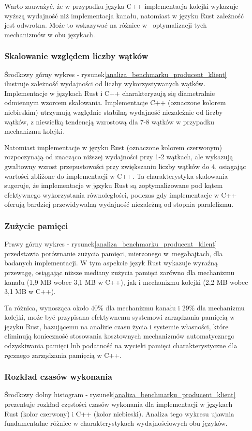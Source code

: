 Warto zauważyć, że w przypadku języka C++ implementacja kolejki wykazuje wyższą wydajność niż implementacja kanału, natomiast w języku Rust zależność jest odwrotna. Może to wskazywać na różnice w~ optymalizacji tych mechanizmów w obu językach.

\subsubsection{Skalowanie względem liczby wątków}
Środkowy górny wykres - rysunek\ref{analiza_benchmarku_producent_klient} ilustruje zależność wydajności od liczby wykorzystywanych wątków. Implementacje w językach Rust i C++ charakteryzują się diametralnie odmiennym wzorcem skalowania. Implementacje C++ (oznaczone kolorem niebieskim) utrzymują względnie stabilną wydajność niezależnie od liczby wątków, z niewielką tendencją wzrostową dla 7-8 wątków w przypadku mechanizmu kolejki.

Natomiast implementacje w języku Rust (oznaczone kolorem czerwonym) rozpoczynają od znacząco niższej wydajności przy 1-2 wątkach, ale wykazują gwałtowny wzrost przepustowości przy zwiększaniu liczby wątków do 4, osiągając wartości zbliżone do implementacji w C++. Ta charakterystyka skalowania sugeruje, że implementacje w języku Rust są zoptymalizowane pod kątem efektywnego wykorzystania równoległości, podczas gdy implementacje w C++ oferują bardziej przewidywalną wydajność niezależną od stopnia paralelizmu.

\subsubsection{Zużycie pamięci}
Prawy górny wykres - rysunek\ref{analiza_benchmarku_producent_klient} przedstawia porównanie zużycia pamięci, mierzonego w~megabajtach, dla badanych implementacji. W tym aspekcie język Rust wykazuje wyraźną przewagę, osiągając niższe mediany zużycia pamięci zarówno dla mechanizmu kanału (1,9 MB wobec 3,1 MB w C++), jak i mechanizmu kolejki (2,2 MB wobec 3,1 MB w C++).

Ta różnica, wynosząca około 40\% dla mechanizmu kanału i 29\% dla mechanizmu kolejki, może być przypisana efektywnemu systemowi zarządzania pamięcią w języku Rust, bazującemu na analizie czasu życia i systemie własności, które eliminują konieczność stosowania kosztownych mechanizmów automatycznego odzyskiwania pamięci lub podatność na wycieki pamięci charakterystyczne dla ręcznego zarządzania pamięcią w C++.

\subsubsection{ Rozkład czasów wykonania}
Środkowy dolny histogram - rysunek\ref{analiza_benchmarku_producent_klient} prezentuje rozkład częstości czasów wykonania dla implementacji w językach Rust (kolor czerwony) i C++ (kolor niebieski). Analiza tego wykresu ujawnia fundamentalne różnice w charakterystykach wydajnościowych obu języków.

